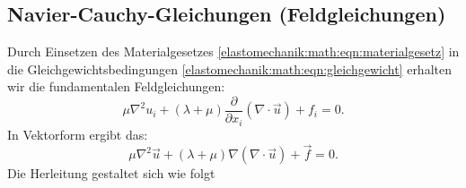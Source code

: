 \subsection{Navier-Cauchy-Gleichungen (Feldgleichungen)}
Durch Einsetzen des Materialgesetzes
\eqref{elastomechanik:math:eqn:materialgesetz}
in die Gleichgewichtsbedingungen
\eqref{elastomechanik:math:eqn:gleichgewicht}
erhalten wir die fundamentalen Feldgleichungen:
\begin{equation*}
	\mu \nabla^2 u_i + (\lambda + \mu) \frac{\partial}{\partial x_i} (\nabla \cdot \vec{u}) + f_i =
	0.
\end{equation*}
In Vektorform ergibt das:
\begin{equation*}
	\mu \nabla^2 \vec{u} + (\lambda + \mu) \nabla (\nabla \cdot \vec{u}) + \vec{f} = 
	0.
\end{equation*}
Die Herleitung gestaltet sich wie folgt

